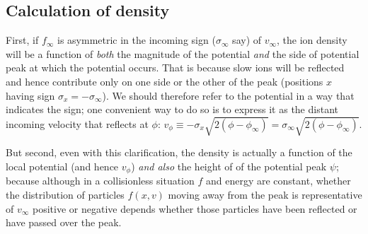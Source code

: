 \documentclass[12pt]{article}
\begin{document}
\subsection{Calculation of density}

First, if $f_\infty$ is asymmetric in the incoming sign ($\sigma_\infty$ say)
of $v_\infty$, the ion density will be a function of \emph{both} the
magnitude of the potential \emph{and} the side of potential peak at
which the potential occurs. That is because slow ions will be
reflected and hence contribute only on one side or the other of the
peak (positions $x$ having sign $\sigma_x=-\sigma_\infty$). We should
therefore refer to the potential in a way that indicates the sign; one
convenient way to do so is to express it as the distant incoming
velocity that reflects at $\phi$:
$v_\phi\equiv-\sigma_x\sqrt{2(\phi-\phi_\infty)}=\sigma_\infty\sqrt{2(\phi-\phi_\infty)}$.

But second, even with this clarification, the density is actually a
function of the local potential (and hence $v_\phi$) \emph{and also} the
height of of the potential peak $\psi$; because although in a
collisionless situation $f$ and energy are constant, whether the
distribution of particles $f(x,v)$ moving away from the peak is
representative of $v_\infty$ positive or negative depends whether
those particles have been reflected or have passed over the peak.
\end{document}

